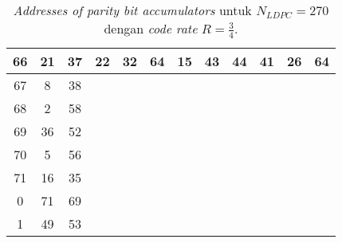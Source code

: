 \begin{table}[tb]
	\centering
	\caption{\textit{Addresses of parity bit accumulators} untuk $N_{LDPC}=270$ dengan \textit{code rate} $R=\frac{3}{4}$.}
	\label{table:rate2}
\begin{tabular}{|c|c|c|lllllllll}
	\hline
	66 & 21 & 37 & \multicolumn{1}{c|}{22} & \multicolumn{1}{c|}{32} & \multicolumn{1}{c|}{64} & \multicolumn{1}{c|}{15} & \multicolumn{1}{c|}{43} & \multicolumn{1}{c|}{44} & \multicolumn{1}{c|}{41} & \multicolumn{1}{c|}{26} & \multicolumn{1}{c|}{64} \\ \hline
	67 & 8  & 38 &                         &                         &                         &                         &                         &                         &                         &                         &                         \\ \cline{1-3}
	68 & 2  & 58 &                         &                         &                         &                         &                         &                         &                         &                         &                         \\ \cline{1-3}
	69 & 36 & 52 &                         &                         &                         &                         &                         &                         &                         &                         &                         \\ \cline{1-3}
	70 & 5  & 56 &                         &                         &                         &                         &                         &                         &                         &                         &                         \\ \cline{1-3}
	71 & 16 & 35 &                         &                         &                         &                         &                         &                         &                         &                         &                         \\ \cline{1-3}
	0  & 71 & 69 &                         &                         &                         &                         &                         &                         &                         &                         &                         \\ \cline{1-3}
	1  & 49 & 53 &                         &                         &                         &                         &                         &                         &                         &                         &                         \\ \cline{1-3}

\end{tabular}
\end{table}
